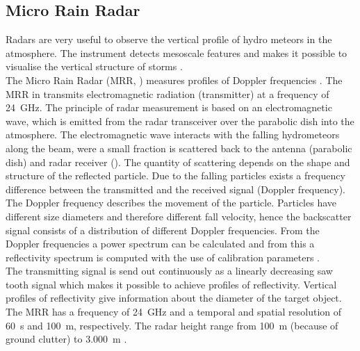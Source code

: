 \subsection{Micro Rain Radar}\label{sec:MRR}

Radars are very useful to observe the vertical profile of hydro meteors in the atmosphere. The instrument detects mesoscale features and makes it possible to visualise the vertical structure of storms \citep{markowski_mesoscale_2011}.
\\
The Micro Rain Radar (MRR, ) measures profiles of Doppler frequencies \citep{metek_micro_2010}.
The MRR in  transmits electromagnetic radiation (transmitter) at a frequency of \SI{24}{\GHz}.
The principle of radar measurement is based on an electromagnetic wave, which is emitted from the radar transceiver over the parabolic dish into the atmosphere. The electromagnetic wave interacts with the falling hydrometeors along the beam, were a small fraction is scattered back to the antenna (parabolic dish) and radar receiver (). 
The quantity of scattering depends on the shape and structure of the reflected particle. 
Due to the falling particles exists a frequency difference between the transmitted and the received signal (Doppler frequency). The Doppler frequency describes the movement of the particle. %
Particles have different size diameters and therefore different fall velocity, hence the backscatter signal consists of a distribution of different Doppler frequencies. From the Doppler frequencies a power spectrum can be calculated and from this a reflectivity spectrum is computed with the use of calibration parameters \citep{metek_micro_2010}.
\\
The transmitting signal is send out continuously as a linearly decreasing saw tooth signal which makes it possible to achieve profiles of reflectivity. Vertical profiles of reflectivity give information about the diameter of the target object.
The MRR has a frequency of \SI{24}{\giga\Hz} and a temporal and spatial resolution of \SI{60}{\second} and \SI{100}{\metre}, respectively. The radar height range from \SI{100}{\metre} (because of ground clutter) to \SI{3.000}{\metre} \citep{metek_micro_2010}.
